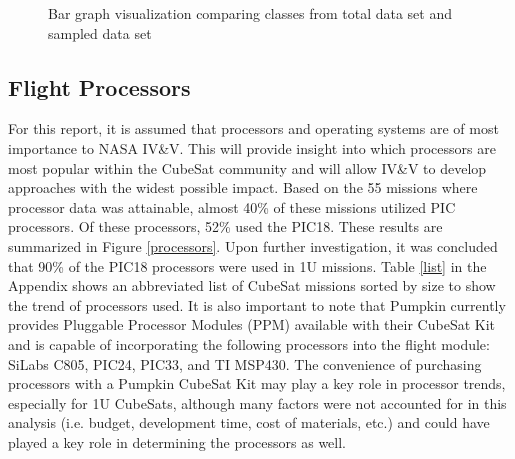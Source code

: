 \documentclass[11pt]{article}
\begin{document}
\begin{figure}[ht!]
\centering
{}
\caption{Bar graph visualization comparing classes from total data set and sampled data set}
\label{compare}
\end{figure}

\subsection{Flight Processors}
For this report, it is assumed that processors and operating systems are of most importance to NASA IV\&V.  This will provide insight into which processors are most popular within the CubeSat community and will allow IV\&V to develop approaches with the widest possible impact.  Based on the 55 missions where processor data was attainable, almost 40\% of these missions utilized PIC processors.  Of these processors, 52\% used the PIC18.  These results are summarized in Figure \ref{processors}.  Upon further investigation, it was concluded that 90\% of the PIC18 processors were used in 1U missions.  Table \ref{list} in the Appendix shows an abbreviated list of CubeSat missions sorted by size to show the trend of processors used.  It is also important to note that Pumpkin currently provides Pluggable Processor Modules (PPM) available with their CubeSat Kit and is capable of incorporating the following processors into the flight module:  SiLabs C805, PIC24, PIC33, and TI MSP430.  The convenience of purchasing processors with a Pumpkin CubeSat Kit may play a key role in processor trends, especially for 1U CubeSats, although many factors were not accounted for in this analysis (i.e. budget, development time, cost of materials, etc.) and  could have played a key role in determining the processors as well.
\end{document}

